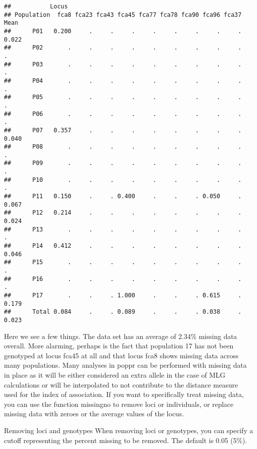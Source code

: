 \documentclass[12pt,]{krantz}
\newenvironment{Shaded}{\begin{snugshade}}{\end{snugshade}}
\newcommand{\KeywordTok}[1]{\textcolor[rgb]{0.27,0.27,0.27}{\textbf{#1}}}
\newcommand{\DataTypeTok}[1]{\textcolor[rgb]{0.27,0.27,0.27}{#1}}
\newcommand{\StringTok}[1]{\textcolor[rgb]{0.5,0.5,0.5}{#1}}
\newcommand{\OtherTok}[1]{\textcolor[rgb]{0.56,0.35,0.01}{#1}}
\newcommand{\OperatorTok}[1]{\textcolor[rgb]{0.81,0.36,0.00}{\textbf{#1}}}
\newcommand{\NormalTok}[1]{#1}
\theoremstyle{definition}
\theoremstyle{definition}
\theoremstyle{definition}
\theoremstyle{remark}
\begin{document}
\begin{verbatim}
##           Locus
## Population  fca8 fca23 fca43 fca45 fca77 fca78 fca90 fca96 fca37  Mean
##      P01   0.200     .     .     .     .     .     .     .     . 0.022
##      P02       .     .     .     .     .     .     .     .     .     .
##      P03       .     .     .     .     .     .     .     .     .     .
##      P04       .     .     .     .     .     .     .     .     .     .
##      P05       .     .     .     .     .     .     .     .     .     .
##      P06       .     .     .     .     .     .     .     .     .     .
##      P07   0.357     .     .     .     .     .     .     .     . 0.040
##      P08       .     .     .     .     .     .     .     .     .     .
##      P09       .     .     .     .     .     .     .     .     .     .
##      P10       .     .     .     .     .     .     .     .     .     .
##      P11   0.150     .     . 0.400     .     .     . 0.050     . 0.067
##      P12   0.214     .     .     .     .     .     .     .     . 0.024
##      P13       .     .     .     .     .     .     .     .     .     .
##      P14   0.412     .     .     .     .     .     .     .     . 0.046
##      P15       .     .     .     .     .     .     .     .     .     .
##      P16       .     .     .     .     .     .     .     .     .     .
##      P17       .     .     . 1.000     .     .     . 0.615     . 0.179
##      Total 0.084     .     . 0.089     .     .     . 0.038     . 0.023
\end{verbatim}

Here we see a few things. The data set has an average of 2.34\% missing
data overall. More alarming, perhaps is the fact that population 17 has
not been genotyped at locus fca45 at all and that locus fca8 shows
missing data across many populations. Many analyses in poppr can be
performed with missing data in place as it will be either considered an
extra allele in the case of MLG calculations or will be interpolated to
not contribute to the distance measure used for the index of
association. If you want to specifically treat missing data, you can use
the function missingno to remove loci or individuals, or replace missing
data with zeroes or the average values of the locus.

Removing loci and genotypes When removing loci or genotypes, you can
specify a cutoff representing the percent missing to be removed. The
default is 0.05 (5\%).

\begin{Shaded}
\end{Shaded}
\end{document}
